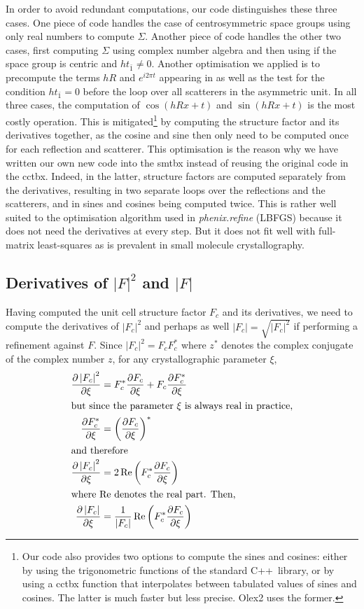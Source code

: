 \documentclass[pdf]{iucr}
\newcommand{\cpp}{C++}
\newcommand{\re}{\operatorname{Re}}
\newcommand{\modulus}[1]{\left| #1 \right|}
\newcommand{\partialder}[2]{\frac{\partial #1}{\partial #2}}
\begin{document}
In order to avoid redundant computations, our code distinguishes these three cases. One piece of code handles the case of centrosymmetric space groups using only real numbers to compute $\Sigma$. Another piece of code handles the other two cases, first computing $\Sigma$ using complex number algebra and then using  if the space group is centric and $h t_{\bar{1}} \neq 0$. Another optimisation we applied is to precompute the terms $hR$ and $e^{i2\pi t}$ appearing in  as well as the test for the condition $h t_{\bar{1}}=0$ before the loop over all scatterers in the asymmetric unit. In all three cases, the computation of $\cos(hRx + t)$ and $\sin(hRx + t)$ is the most costly operation. This is mitigated\footnote{Our code also provides two options to compute the sines and cosines: either by using the trigonometric functions of the standard \cpp\ library, or by using a cctbx function that interpolates between tabulated values of sines and cosines. The latter is much faster but less precise. Olex2 uses the former.} by computing the structure factor and its derivatives together, as the cosine and sine then only need to be computed once for each reflection and scatterer.
This optimisation is the reason why we have written our own new code into the smtbx instead of reusing the original code in the cctbx. Indeed, in the latter, structure factors are computed separately from the derivatives, resulting in two separate loops over the reflections and the scatterers, and in sines and cosines being computed twice. This is rather well suited to the optimisation algorithm used in \emph{phenix.refine} (LBFGS) because it does not need the derivatives at every step. But it does not fit well with full-matrix least-squares as is prevalent in small molecule crystallography.  

\subsection{Derivatives of $\modulus{F}^2$ and $\modulus{F}$}

Having computed the unit cell structure factor $F_c$ and its derivatives, we need to compute the derivatives of $\modulus{F_c}^2$ and perhaps as well $\modulus{F_c} = \sqrt{\modulus{F_c}^2}$ if performing a refinement against $F$. Since $\modulus{F_c}^2 = F_c F_c^*$ where $z^*$ denotes the complex conjugate of the complex number $z$, for any crystallographic parameter $\xi$,
\begin{align}
\partialder{\modulus{F_c}^2}{\xi} &= F_c^* \partialder{F_c}{\xi} + F_c \partialder{F_c^*}{\xi} \nonumber \\
\shortintertext{but since the parameter $\xi$ is always real in practice,}
\partialder{F_c^*}{\xi} &= \left( \partialder{F_c}{\xi} \right)^* \\
\shortintertext{and therefore}
\partialder{\modulus{F_c}^2}{\xi} &= 2\re\left( F_c^* \partialder{F_c}{\xi}\right) \\
\shortintertext{where $\re$ denotes the real part. Then,}
\partialder{\modulus{F_c}}{\xi} &= \frac{1}{\modulus{F_c}} \re\left( F_c^* \partialder{F_c}{\xi}\right)
\end{align}
\end{document}
